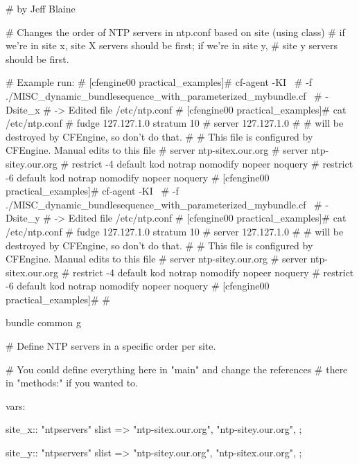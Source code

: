 \begin{codelisting}
\begin{code}
# by Jeff Blaine

# Changes the order of NTP servers in ntp.conf based on site (using class)
# if we're in site x, site X servers should be first; if we're in site y,
# site y servers should be first.

# Example run:
#    [cfengine00  practical_examples]# cf-agent -KI \
#      -f ./MISC_dynamic_bundlesequence_with_parameterized_mybundle.cf \
#       -Dsite_x
#     -> Edited file /etc/ntp.conf
#    [cfengine00  practical_examples]# cat /etc/ntp.conf
#    fudge   127.127.1.0 stratum 10
#    server  127.127.1.0
#    # will be destroyed by CFEngine, so don't do that.
#    # This file is configured by CFEngine.  Manual edits to this file
#    server ntp-sitex.our.org
#    server ntp-sitey.our.org
#    restrict -4 default kod notrap nomodify nopeer noquery
#    restrict -6 default kod notrap nomodify nopeer noquery
#    [cfengine00  practical_examples]# cf-agent -KI \
#      -f ./MISC_dynamic_bundlesequence_with_parameterized_mybundle.cf \
#      -Dsite_y
#     -> Edited file /etc/ntp.conf
#    [cfengine00  practical_examples]# cat /etc/ntp.conf
#    fudge   127.127.1.0 stratum 10
#    server  127.127.1.0
#    # will be destroyed by CFEngine, so don't do that.
#    # This file is configured by CFEngine.  Manual edits to this file
#    server ntp-sitey.our.org
#    server ntp-sitex.our.org
#    restrict -4 default kod notrap nomodify nopeer noquery
#    restrict -6 default kod notrap nomodify nopeer noquery
#    [cfengine00  practical_examples]#
#



bundle common g
{
      # Define NTP servers in a specific order per site.

      # You could define everything here in "main" and change the references
      # there in "methods:" if you wanted to.

  vars:

    site_x::
      "ntpservers" slist => {
                              "ntp-sitex.our.org",
                              "ntp-sitey.our.org",
      };

    site_y::
      "ntpservers" slist => {
                              "ntp-sitey.our.org",
                              "ntp-sitex.our.org",
      };
}


\end{code}
\end{codelisting}
